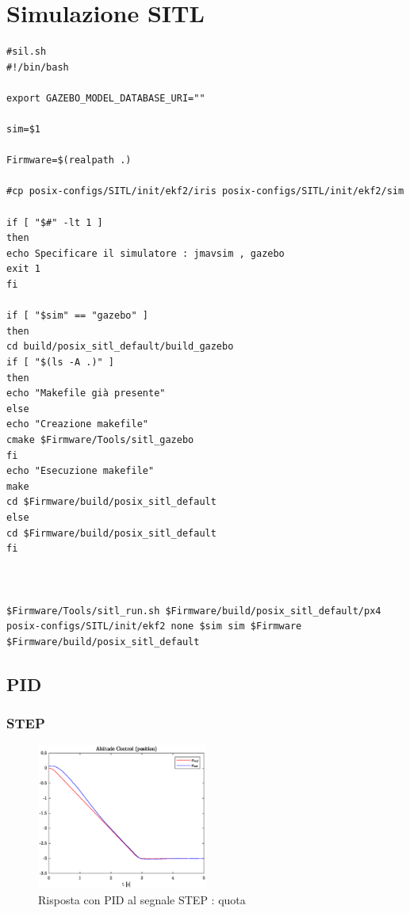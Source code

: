 \section{Simulazione SITL}

\begin{lstlisting}
#sil.sh
#!/bin/bash

export GAZEBO_MODEL_DATABASE_URI=""

sim=$1

Firmware=$(realpath .)

#cp posix-configs/SITL/init/ekf2/iris posix-configs/SITL/init/ekf2/sim

if [ "$#" -lt 1 ]
then
echo Specificare il simulatore : jmavsim , gazebo
exit 1
fi

if [ "$sim" == "gazebo" ] 
then
cd build/posix_sitl_default/build_gazebo
if [ "$(ls -A .)" ]
then
echo "Makefile già presente"
else
echo "Creazione makefile"
cmake $Firmware/Tools/sitl_gazebo
fi
echo "Esecuzione makefile"
make
cd $Firmware/build/posix_sitl_default
else
cd $Firmware/build/posix_sitl_default
fi



$Firmware/Tools/sitl_run.sh $Firmware/build/posix_sitl_default/px4  posix-configs/SITL/init/ekf2 none $sim sim $Firmware $Firmware/build/posix_sitl_default
\end{lstlisting}

\subsection{PID}
\subsubsection{STEP}
\begin{figure}
	\centering
	\includegraphics[width=0.5\textwidth]{Simulazioni/Figure/PID/STEP/AltitudeControlPos}
	\caption{Risposta con PID al segnale STEP : quota}
\end{figure}

